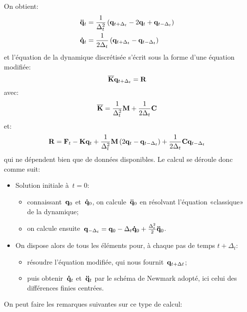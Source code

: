 On obtient:
\begin{equation}
\begin{aligned}
&\VV{\ddot q}_t = \frac1{\Delta_t^2} \left( \VV{q}_{t+\Delta_t} - 2\VV{q}_t + \VV{q}_{t-\Delta_t}\right)\\
&\VV{\dot q}_t = \frac1{2\Delta_t}\left( \VV{q}_{t+\Delta_t} - \VV{q}_{t-\Delta_t}\right)
\end{aligned}
\end{equation}
et l'équation de la dynamique discrétisée s'écrit sous la forme d'une équation modifiée:
\begin{equation}
\MM{\overline{K}} \VV{q}_{t+\Delta_t} = \VV{R}
\end{equation}
avec:
\begin{equation}
\MM{\overline{K}} = \frac1{\Delta_t^2}\MM{M}+\frac1{2\Delta_t}\MM{C}
\end{equation}
et:
\begin{equation}
\VV{R} = \VV{F}_t -\MM{K}\VV{q}_t + \frac1{\Delta_t^2}\MM{M}\left( 2\VV{q}_t -\VV{q}_{t-\Delta_t}\right)
+\frac1{2\Delta_t}\MM{C}\VV{q}_{t-\Delta_t}
\end{equation}
qui ne dépendent bien que de données disponibles.
\medskipvm
Le calcul se déroule donc comme suit:
\begin{itemize}
  \item Solution initiale à~$t=0$:
	\begin{itemize}
	\item connaissant~$\VV{q}_0$ et~$\VV{\dot q}_0$, on calcule~$\VV{\ddot q}_0$ en résolvant
	l'équation «classique» de la dynamique;
	\item on calcule ensuite~$\VV{q}_{-\Delta_t} = \VV{q}_0 -\Delta_t \VV{\dot q}_0 + \frac{\Delta_t^2}2
	\VV{\ddot q}_0$.
	\end{itemize}
  \item On dispose alors de tous les éléments pour, à chaque pas de temps
	$t+\Delta_t$:
	\begin{itemize}
	\item résoudre l'équation modifiée, qui nous fournit~$\VV{q}_{t+\Delta t}$;
	\item puis obtenir~$\VV{\dot q}_t$ et~$\VV{\ddot q}_t$ par le schéma de Newmark adopté,
	ici celui des différences finies centrées.
	\end{itemize}
\end{itemize}
\bigskip
On peut faire les remarques suivantes sur ce type de calcul:

